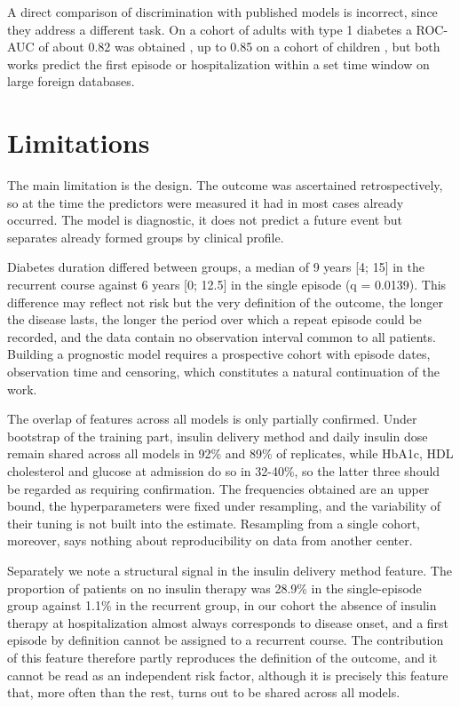 \documentclass[pdflatex,sn-basic,Numbered]{sn-jnl}
\begin{document}
A direct comparison of discrimination with published models is incorrect, since they address a different task. On a cohort of adults with type 1 diabetes a ROC-AUC of about 0.82 was obtained \cite{ref11}, up to 0.85 on a cohort of children \cite{ref10}, but both works predict the first episode or hospitalization within a set time window on large foreign databases.

\section{Limitations}\label{sec5}

The main limitation is the design. The outcome was ascertained retrospectively, so at the time the predictors were measured it had in most cases already occurred. The model is diagnostic, it does not predict a future event but separates already formed groups by clinical profile.

Diabetes duration differed between groups, a median of 9 years [4; 15] in the recurrent course against 6 years [0; 12.5] in the single episode (q = 0.0139). This difference may reflect not risk but the very definition of the outcome, the longer the disease lasts, the longer the period over which a repeat episode could be recorded, and the data contain no observation interval common to all patients. Building a prognostic model requires a prospective cohort with episode dates, observation time and censoring, which constitutes a natural continuation of the work.

The overlap of features across all models is only partially confirmed. Under bootstrap of the training part, insulin delivery method and daily insulin dose remain shared across all models in 92\% and 89\% of replicates, while HbA1c, HDL cholesterol and glucose at admission do so in 32-40\%, so the latter three should be regarded as requiring confirmation. The frequencies obtained are an upper bound, the hyperparameters were fixed under resampling, and the variability of their tuning is not built into the estimate. Resampling from a single cohort, moreover, says nothing about reproducibility on data from another center.

Separately we note a structural signal in the insulin delivery method feature. The proportion of patients on no insulin therapy was 28.9\% in the single-episode group against 1.1\% in the recurrent group, in our cohort the absence of insulin therapy at hospitalization almost always corresponds to disease onset, and a first episode by definition cannot be assigned to a recurrent course. The contribution of this feature therefore partly reproduces the definition of the outcome, and it cannot be read as an independent risk factor, although it is precisely this feature that, more often than the rest, turns out to be shared across all models.
\end{document}
